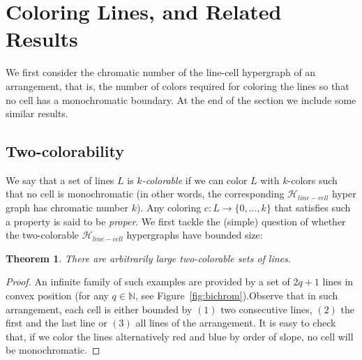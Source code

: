 \documentclass[11pt,a4paper]{article}
\newtheorem{theorem}{Theorem}
\newtheorem{open}{Open Problem}
\newcommand{\Hlinecell}{{\mathcal H}_{line-cell}}
\newcommand{\sholong}[2]{#2}
\begin{document}
\section{Coloring Lines, and Related Results}\label{sec:coloring}

We first consider the chromatic number of the line-cell hypergraph of an arrangement, that is, the number of colors required for coloring the lines so that no cell has a monochromatic boundary. At the end of the section we include some similar results.

\subsection{Two-colorability}

We say that a set of lines $L$ is {\em $k$-colorable} if we can color $L$ with $k$-colors such that no cell is monochromatic (in other words, the corresponding $\Hlinecell$ hyper graph has chromatic number $k$). Any coloring $c:L \rightarrow \{0,\ldots, k\}$ that satisfies such a property is said to be {\em proper}. We first tackle the (simple) question of whether the two-colorable $\Hlinecell$ hypergraphs have bounded size:

\begin{theorem}\label{prop:2colors}
There are arbitrarily large two-colorable sets of lines.
\end{theorem}



\begin{proof} An infinite family of such examples are provided by a set of $2q+1$ lines in convex position (for any $q\in \mathbb{N}$\sholong{)}{, see Figure~\ref{fig:bichrom})}.Observe that in such arrangement, each cell is either bounded by $(1)$ two consecutive lines, $(2)$ the first and the last line or $(3)$ all lines of the arrangement. It is easy to check that, if we color the lines alternatively red and blue by order of slope, no cell will be monochromatic.
\end{proof}

\begin{comment}
It is easy to find arbitrarily large arrangements of lines that are not two colorable. Hence,  a natural question --so far elusive to us-- arising from the previous result, is to determine if a given arrangement is two colorable.
\begin{open}
Is it NP-hard to decide if a set of lines can be two-colored avoiding monochromatic cells?
\end{open}
\end{comment}
\end{document}
